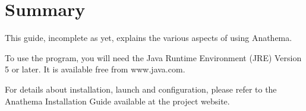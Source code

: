 \chapter{Summary}
This guide, incomplete as yet, explains the various aspects of using Anathema. 

To use the program, you will need the Java Runtime Environment (JRE) Version 5 or later. It is available free from www.java.com.

For details about installation, launch and configuration, please refer to the Anathema Installation Guide available at the project website.
